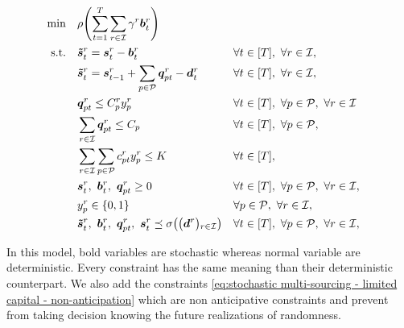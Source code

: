 \begin{subequations}\label{eq:stochastic multi-sourcing - limited capital}
  \begin{align}
    \min\quad & \rlap{$\ds \rho\bracket{\sum_{t=1}^{\horizon} \sum_{r\in\REF} \backorder^r \va\backlog_t^r}$}
    \label{eq:stochastic multi-sourcing - limited capital - objective}
    \\
    \st\quad & \ds \va\level_t^r = \va\inventory_t^r - \va\backlog_t^r && \forall t\in\range{\horizon},\ \forall r\in\REF,
    \label{eq:stochastic multi-sourcing - limited capital - inventory}
    \\
    & \ds \va\level_t^r = \va\inventory_{t-1}^r + \sum_{p\in\plants}\va\quantity_{pt}^r - \va\demand_t^r && \forall t\in\range{\horizon},\ \forall r\in\REF,
    \label{eq:stochastic multi-sourcing - limited capital - dynamic}
    \\
    & \ds \va\quantity_{pt}^r \le \capacity_p^r \assign_p^r && \forall t\in\range{\horizon},\ \forall p\in\plants,\ \forall r\in\REF
    \label{eq:stochastic multi-sourcing - limited capital - big M}
    \\
    & \ds \sum_{r\in\REF}\va\quantity_{pt}^r \le \capacity_p && \forall t\in\range{\horizon},\ \forall p\in\plants,
    \label{eq:stochastic multi-sourcing - limited capital - capacity}
    \\
    & \ds \sum_{r\in\REF} \sum_{p\in\plants}\affect_{pt}^r\assign_p^r \le \capital && \forall t\in\range{\horizon},
    \label{eq:stochastic multi-sourcing - limited capital - capital}
    \\
    & \ds \va\inventory_t^r,\ \va\backlog_t^r,\ \va\quantity_{pt}^r \ge 0 && \forall t\in\range{\horizon},\ \forall p\in\plants,\ \forall r\in\REF,
    \label{eq:stochastic multi-sourcing - limited capital - nonnegativity}
    \\
    & \ds \assign_p^r \in \crbracket{0,1} && \forall p\in\plants,\ \forall r\in\REF,
    \label{eq:stochastic multi-sourcing - limited capital - binary}
    \\
    & \ds \va\level_t^r,\ \va\backlog_t^r,\ \va\quantity_{pt}^r,\ \va\inventory_t^r \preceq \Sfield{\bracket{\va\demand^r}_{r\in\REF}} && \forall t\in\range{\horizon},\ \forall p\in\plants,\ \forall r\in\REF,
    \label{eq:stochastic multi-sourcing - limited capital - non-anticipation}
  \end{align}
\end{subequations}

In this model, bold variables are stochastic whereas normal variable are deterministic. Every constraint has the same meaning than their deterministic counterpart. We also add the constraints \eqref{eq:stochastic multi-sourcing - limited capital - non-anticipation} which are non anticipative constraints and prevent from taking decision knowing the future realizations of randomness.


